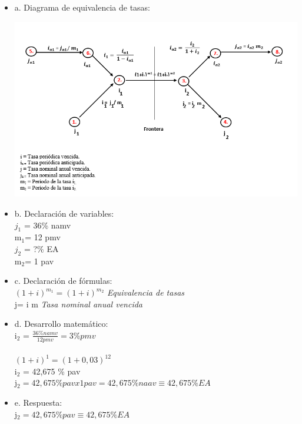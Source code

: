 \begin{itemize}
    \item a. Diagrama de equivalencia de tasas:\\
	
	\begin{center}
	\includegraphics[height = 9.0 cm]{general}\\		
	\end{center}
	
	\item b. Declaración de variables:\\
	$j_{1}$ = 36\% namv \\ 
	m$_{1}$= 12 pmv \\
	$j_{2}$ = ?\% EA\\
	m$_{2}$= 1 pav \\
	\item c. Declaración de fórmulas:\\
		$(1+i)^{m_1} = (1+i)^{m_2}$  \hspace{35 pt} \textit{Equivalencia de tasas}\\
     j= i  m    \hspace{70 pt}\textit{Tasa nominal anual vencida}   \\
	
	\item d. Desarrollo matemático:\\
	
	i$_{2}$ = $\frac{36\%namv}{12 pmv }= 3\% pmv $\\ \\
	
		$(1+i)^{1} = (1+0,03)^{12}$ \\

i$_{2}$ = 42,675 \% pav\\
j$_{2} = 42,675 \% pav x 1 pav = 42,675 \% naav  \equiv
   42,675 \% EA$ \\
	
	\item e. Respuesta:\\

    j$_{2} = 42,675 \% pav\equiv
   42,675 \% EA$ \\
	

\end{itemize}


